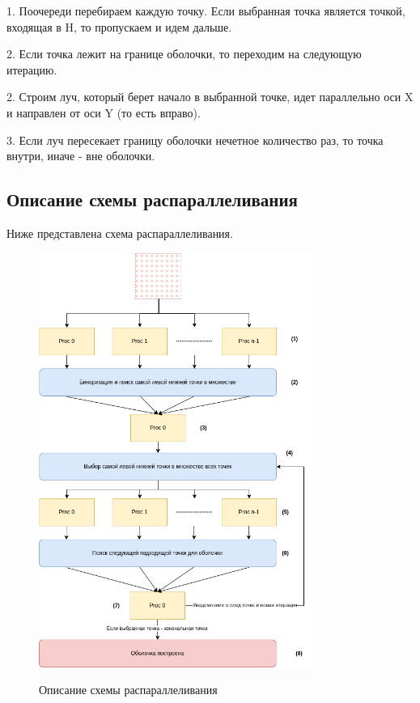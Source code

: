 \documentclass[a4paper, 12pt]{article}
\begin{document}
1. Поочереди перебираем каждую точку. Если выбранная точка является точкой, входящая в {H}, то пропускаем и идем дальше.

2. Если точка лежит на границе оболочки, то переходим на следующую итерацию.

2. Строим луч, который берет начало в выбранной точке, идет параллельно оси {X} и направлен от оси {Y} (то есть вправо).

3. Если луч пересекает границу оболочки нечетное количество раз, то точка внутри, иначе - вне оболочки.

\newpage
\begin{center}
    \section{Описание схемы распараллеливания}
\end{center}

Ниже представлена схема распараллеливания.

\begin{figure}[h!]
    \centering
    \includegraphics[width=0.8\textwidth]{images/image.png}\\[5mm]
    \caption{Описание схемы распараллеливания}
    \label{fig:project}
\end{figure}
\end{document}
